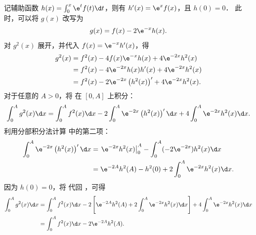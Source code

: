 \begin{myproof}
    记辅助函数 $h(x) = \int_0^x \e^t f(t) \d t$，则有 $h'(x) = \e^x f(x)$，且 $h(0) = 0$．
    此时，可以将 $g(x)$ 改写为
    \begin{equation}\label{eq:q15-g-h-relation-3}
        g(x) = f(x) - 2\e^{-x} h(x).
    \end{equation}
    对 $g^2(x)$ 展开，并代入 $f(x) = \e^{-x} h'(x)$，得
    \begin{equation}\label{eq:q15-g-squared-4}
        \begin{aligned}
            g^2(x)
             & = f^2(x) - 4 f(x) \e^{-x} h(x) + 4\e^{-2x} h^2(x)               \\
             & = f^2(x) - 4\e^{-2x} h(x) h'(x) + 4\e^{-2x} h^2(x)              \\
             & = f^2(x) - 2\e^{-2x} \left( h^2(x) \right)' + 4\e^{-2x} h^2(x).
        \end{aligned}
    \end{equation}
    对于任意的 $A > 0$，将  在 $[0, A]$ 上积分：
    \begin{equation}\label{eq:q15-g-integral-5}
        \int_0^A g^2(x) \d x = \int_0^A f^2(x) \d x - 2 \int_0^A \e^{-2x} \left( h^2(x) \right)' \d x + 4 \int_0^A \e^{-2x} h^2(x) \d x.
    \end{equation}
    利用分部积分法计算  中的第二项：
    \begin{equation}\label{eq:q15-by-parts-6}
        \begin{aligned}
            \int_0^A \e^{-2x} \left( h^2(x) \right)' \d x
             & = \left. \e^{-2x} h^2(x) \right|_0^A - \int_0^A (-2\e^{-2x}) h^2(x) \d x \\
             & = \e^{-2A} h^2(A) - h^2(0) + 2 \int_0^A \e^{-2x} h^2(x) \d x.
        \end{aligned}
    \end{equation}
    因为 $h(0) = 0$，将  代回 ，可得
    \begin{equation}\label{eq:q15-g-simplified-7}
        \begin{aligned}
            \int_0^A g^2(x) \d x
             & = \int_0^A f^2(x) \d x - 2 \left[ \e^{-2A} h^2(A) + 2 \int_0^A \e^{-2x} h^2(x) \d x \right] + 4 \int_0^A \e^{-2x} h^2(x) \d x \\
             & = \int_0^A f^2(x) \d x - 2 \e^{-2A} h^2(A).
        \end{aligned}
    \end{equation}


\end{myproof}
